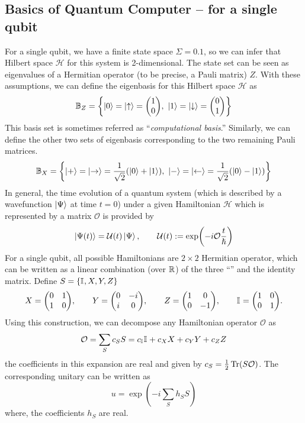 \documentclass[11pt, oneside, listof=totoc]{scrbook}
\renewcommand{\H}{\mathcal{H}}
\renewcommand{\O}{\mathcal{O}}
\newcommand{\ku}{\ket{0}}
\newcommand{\kd}{\ket{1}}
\newcommand{\kr}{\ket{+}}
\newcommand{\kl}{\ket{-}}
\newcommand{\UU}{\mathcal{U}}
\begin{document}
\subsection{Basics of Quantum Computer -- for a single qubit}
For a single qubit, we have a finite state space \(\Sigma = \qty{0, 1}\), so we can infer that Hilbert space \(\H\) for this system is 2-dimensional. The state set can be seen as eigenvalues of a Hermitian operator (to be precise, a Pauli matrix) \(Z\). With these assumptions, we can define the eigenbasis for this Hilbert space \(\H\) as
\begin{equation}
    \B_Z = \qty{\ku = \ket{\uparrow} = \mqty(1 \\ 0),~ \kd= \ket{\downarrow} = \mqty(0 \\ 1)}
\end{equation}
This basis set is sometimes referred as ``\emph{computational basis}.'' Similarly, we can define the other two sets of eigenbasis corresponding to the two remaining Pauli matrices.
\begin{equation}
    \B_X = \qty{\kr = \ket{\rightarrow} = \frac{1}{\sqrt{2}} \qty(\ku + \kd),~ \kl = \ket{\leftarrow} = \frac{1}{\sqrt{2}} \qty(\ku - \kd)}
\end{equation}
In general, the time evolution of a quantum system (which is described by a wavefunction \(\ket{\Psi}\) at time \(t = 0\)) under a given Hamiltonian \(\mathscr{H}\) which is represented by a matrix \(\O\) is provided by
\[
    \ket{\Psi (t)} = \UU(t) \ket{\Psi}, \qquad \UU(t) := \exp(- i \O \frac{t}{\hslash})
\]
For a single qubit, all possible Hamiltonians are \(2 \times 2\) Hermitian operator, which can be written as a linear combination (over \(\mathbb R\)) of the three ``'' and the identity matrix. Define \(S = \qty{\mathbb{I}_{}, X, Y, Z}\)
\begin{equation}
    X = \mqty(0 & 1 \\ 1 & 0), \qquad Y = \mqty(0 & -i \\ i & 0), \qquad Z = \mqty(1 & 0 \\ 0 & -1), \qquad \I{} = \mqty(1 & 0 \\ 0 & 1).
\end{equation}
Using this construction, we can decompose any Hamiltonian operator \(\O\) as
\[
    \O = \sum_{S} c_S S = c_{\I{}} \I{} + c_X X + c_Y Y + c_Z Z
\]
the coefficients in this expansion are real and given by \(c_S = \half \Tr(S \O)\). The corresponding unitary can be written as
\[
    u = \exp(- i \sum_{S} h_S S)
\]
where, the coefficients \(h_S\) are real.\\
\end{document}
